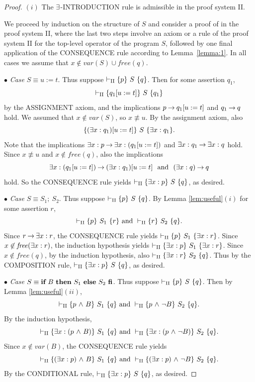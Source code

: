 \documentclass[runningheads]{llncs}       %
\begin{document}
\begin{proof}

\vspace{3mm}

\noindent
$(i)$  The $\mbox{$\exists$}$-{\rm INTRODUCTION} rule is admissible in the proof system {\rm II}.

We proceed by induction on the structure of $S$
and consider a proof of  in the proof system \rm{II}, where 
the last two steps involve an axiom or a rule of the proof system \rm{II} for 
the top-level operator of the program $S$, 
followed by one final application of the CONSEQUENCE rule
according to Lemma~\ref{lemma:1}.
In all cases we assume that $x \not\in var(S) \cup \mathit{free}(q)$.

\vspace{2mm}

\NI
$\bullet$ \emph{Case} $S \equiv u:=t$.
Thus suppose $\vdash_{\rm{II}} \mbox{$\{{p}\}\ {S}\ \{{q}\}$}$.
Then for some assertion $q_1$,
\[
 \vdash_{\rm{II}} \mbox{$\{{q_1[u:=t]}\}\ {S}\ \{{q_1}\}$}
\]
by the ASSIGNMENT axiom,
and the implications 
$p \mbox{$\:\rightarrow\:$} q_1[u:=t]$ and $q_1 \mbox{$\:\rightarrow\:$} q$ hold.
We assumed that $x \not\in var(S)$,
so $x \not \equiv u$. 
By the assignment axiom, also
\[
 \mbox{$\{{(\mbox{$\exists$} x:q_1)[u:=t]}\}\ {S}\ \{{\mbox{$\exists$} x:q_1}\}$}.
\]
Note that the implications 
$\mbox{$\exists$} x:p \mbox{$\:\rightarrow\:$} \mbox{$\exists$} x: (q_1[u:=t])$ and $\mbox{$\exists$} x: q_1 \mbox{$\:\rightarrow\:$} \mbox{$\exists$} x: q$ hold.
Since $x \not \equiv u$ and $x \not\in \mathit{free}(q)$, 
also the implications 
\[
 \mbox{$\exists$} x: (q_1[u:=t]) \mbox{$\:\rightarrow\:$} (\mbox{$\exists$} x:q_1)[u:=t] \ \mbox{ and }\  (\mbox{$\exists$} x:q) \mbox{$\:\rightarrow\:$} q
\] 
hold.
So the CONSEQUENCE rule yields
$\vdash_{\rm{II}}  \mbox{$\{{\mbox{$\exists$} x: p}\}\ {S}\ \{{q}\}$}$, as desired.

\vspace{2mm}

\NI
$\bullet$ \emph{Case} $S \equiv S_1 ;\ S_2$.
Thus suppose $\vdash_{\rm{II}} \mbox{$\{{p}\}\ {S}\ \{{q}\}$}$.
By Lemma \ref{lem:useful}$(i)$
for some assertion $r$, 
\[
 \vdash_{\rm{II}} \mbox{$\{{p}\}\ {S_1}\ \{{r}\}$}  \mbox{ and }
 \vdash_{\rm{II}} \mbox{$\{{r}\}\ {S_2}\ \{{q}\}$}.
\]
Since $r \mbox{$\:\rightarrow\:$} \mbox{$\exists$} x:r$, the CONSEQUENCE rule yields
$\vdash_{\rm{II}}  \mbox{$\{{p}\}\ {S_1}\ \{{\mbox{$\exists$} x: r}\}$}$.
Since $x \not \in \mathit{free}(\mbox{$\exists$} x: r)$, the induction hypothesis yields
$\vdash_{\rm{II}}  \mbox{$\{{\mbox{$\exists$} x: p}\}\ {S_1}\ \{{\mbox{$\exists$} x: r}\}$}$.
Since $x \not\in \mathit{free}(q)$, 
by the induction hypothesis, also $\vdash_{\rm{II}}  \mbox{$\{{\mbox{$\exists$} x: r}\}\ {S_2}\ \{{q}\}$}$.
Thus by the COMPOSITION  rule, 
$\vdash_{\rm{II}}  \mbox{$\{{\mbox{$\exists$} x: p}\}\ {S}\ \{{q}\}$}$, as desired.


\vspace{2mm}

\NI
$\bullet$ \emph{Case} $S \equiv \mbox{$\mbox{{\bf if}\ } {B} \mbox{\ {\bf then}\ } {S_1} \mbox{\ {\bf else}\ } {S_2}\ \mbox{{\bf fi}}$}$.
Thus suppose $\vdash_{\rm{II}} \mbox{$\{{p}\}\ {S}\ \{{q}\}$}$.
Then by Lemma \ref{lem:useful}$(ii)$,
\[
 \vdash_{\rm{II}} \mbox{$\{{p \mbox{$\ \wedge\ $} B}\}\ {S_1}\ \{{q}\}$} \mbox{ and }
 \vdash_{\rm{II}} \mbox{$\{{p \mbox{$\ \wedge\ $} \neg B}\}\ {S_2}\ \{{q}\}$}.
\]
By the induction hypothesis,
\[
 \vdash_{\rm{II}} \mbox{$\{{\mbox{$\exists$} x: (p \mbox{$\ \wedge\ $} B)}\}\ {S_1}\ \{{q}\}$}  \mbox{ and }
 \vdash_{\rm{II}} \mbox{$\{{\mbox{$\exists$} x: (p \mbox{$\ \wedge\ $} \neg B)}\}\ {S_2}\ \{{q}\}$}.
\]
Since $x \not\in var(B)$, the CONSEQUENCE rule yields
\[
 \vdash_{\rm{II}} \mbox{$\{{(\mbox{$\exists$} x: p) \mbox{$\ \wedge\ $} B}\}\ {S_1}\ \{{q}\}$}  \mbox{ and }
 \vdash_{\rm{II}} \mbox{$\{{(\mbox{$\exists$} x: p) \mbox{$\ \wedge\ $} \neg B}\}\ {S_2}\ \{{q}\}$}.
\]
By the CONDITIONAL rule,
$\vdash_{\rm{II}} \mbox{$\{{\mbox{$\exists$} x: p}\}\ {S}\ \{{q}\}$}$,
as desired.


\end{proof}
\end{document}
